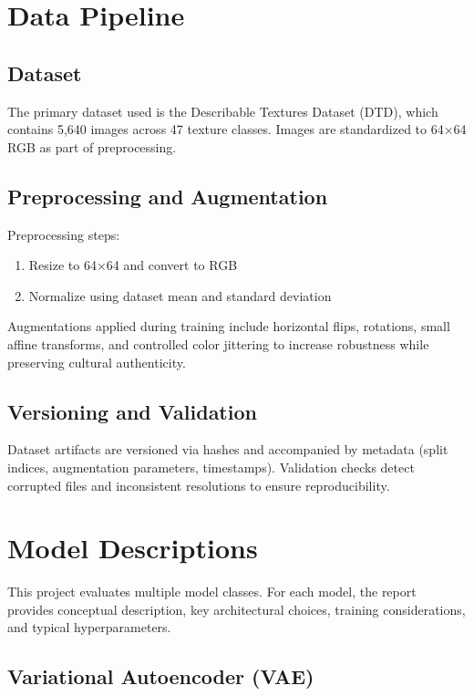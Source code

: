 \documentclass[12pt,a4paper]{report}
\begin{document}
\chapter{Data Pipeline}

\section{Dataset}

The primary dataset used is the Describable Textures Dataset (DTD), which contains 5,640 images across 47 texture classes. Images are standardized to 64×64 RGB as part of preprocessing.

\section{Preprocessing and Augmentation}

Preprocessing steps:
\begin{enumerate}
  \item Resize to 64×64 and convert to RGB
  \item Normalize using dataset mean and standard deviation
\end{enumerate}

Augmentations applied during training include horizontal flips, rotations, small affine transforms, and controlled color jittering to increase robustness while preserving cultural authenticity.

\section{Versioning and Validation}

Dataset artifacts are versioned via hashes and accompanied by metadata (split indices, augmentation parameters, timestamps). Validation checks detect corrupted files and inconsistent resolutions to ensure reproducibility.

\chapter{Model Descriptions}

This project evaluates multiple model classes. For each model, the report provides conceptual description, key architectural choices, training considerations, and typical hyperparameters.

\section{Variational Autoencoder (VAE)}
\end{document}
